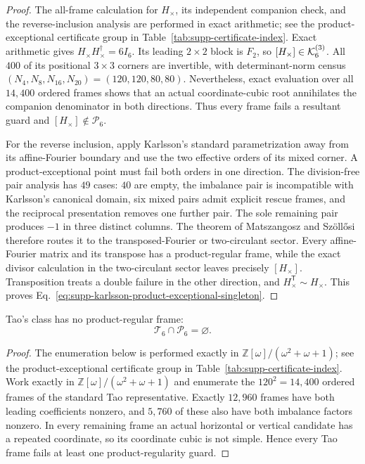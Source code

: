 \begin{proof}
{The all-frame calculation for $H_\times$, its independent companion check, and the reverse-inclusion analysis are performed in exact arithmetic; see the product-exceptional certificate group in Table~\ref{tab:supp-certificate-index}.}
Exact arithmetic gives $H_\times H_\times^\dagger=6I_6$. Its leading
$2\times2$ block is $F_2$, so $[H_\times]\in\mathcal K_6^{(3)}$. All $400$ of its
positional $3\times3$ corners are invertible, with determinant-norm census
$(N_4,N_8,N_{16},N_{20})=(120,120,80,80)$. Nevertheless, exact evaluation
over all $14{,}400$ ordered frames shows that an actual coordinate-cubic root
annihilates the companion denominator in both directions. Thus every frame
fails a resultant guard and $[H_\times]\notin\mathcal P_6$.

For the reverse inclusion, apply Karlsson's standard parametrization away
from its affine-Fourier boundary and use the two effective orders of its
mixed corner. A product-exceptional point must fail both orders in one
direction. The division-free pair analysis has $49$ cases: $40$ are empty,
the imbalance pair is incompatible with Karlsson's canonical domain, six
mixed pairs admit explicit rescue frames, and the reciprocal presentation
removes one further pair. The sole remaining pair produces $-1$ in three
distinct columns. The theorem of Matszangosz and Sz\"oll\H{o}si
\cite{MatszangoszSzollosi2024} therefore routes it to the transposed-Fourier
or two-circulant sector. Every affine-Fourier matrix and its transpose has a
product-regular frame, while the exact divisor calculation in the
two-circulant sector leaves precisely $[H_\times]$. Transposition treats a
double failure in the other direction, and $H_\times^{\mathsf T}\sim H_\times$.
This proves Eq.~\eqref{eq:supp-karlsson-product-exceptional-singleton}.
\end{proof}


\begin{proposition}
\label{prop:supp-tao-product-exceptional}
Tao's class has no product-regular frame:
\begin{equation}
\mathcal T_6\cap\mathcal P_6=\varnothing.
\label{eq:supp-tao-product-exceptional}
\end{equation}
\end{proposition}

\begin{proof}
The enumeration below is performed exactly in $\mathbb Z[\omega]/(\omega^2+\omega+1)$; see the product-exceptional certificate group in Table~\ref{tab:supp-certificate-index}.
Work exactly in $\mathbb Z[\omega]/(\omega^2+\omega+1)$ and enumerate the
$120^2=14{,}400$ ordered frames of the standard Tao representative. Exactly
$12{,}960$ frames have both leading coefficients nonzero, and $5{,}760$ of
these also have both imbalance factors nonzero. In every remaining frame an
actual horizontal or vertical candidate has a repeated coordinate, so its
coordinate cubic is not simple. Hence every Tao frame fails at least one
product-regularity guard.
\end{proof}

